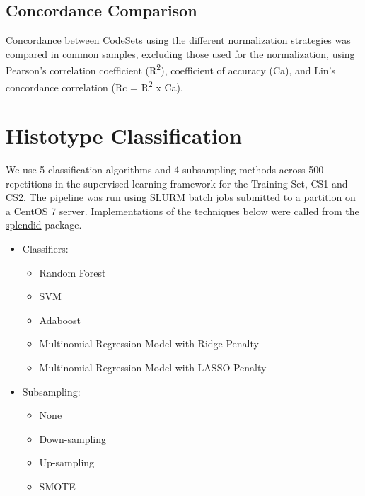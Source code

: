 \documentclass[
]{report}
\providecommand{\tightlist}{%
  \setlength{\itemsep}{0pt}\setlength{\parskip}{0pt}}
\begin{document}
\hypertarget{concordance-comparison}{%
\subsection{Concordance Comparison}\label{concordance-comparison}}

Concordance between CodeSets using the different normalization strategies was compared in common samples, excluding those used for the normalization, using Pearson's correlation coefficient (R\textsuperscript{2}), coefficient of accuracy (Ca), and Lin's concordance correlation (Rc = R\textsuperscript{2} x Ca).

\hypertarget{histotype-classification}{%
\section{Histotype Classification}\label{histotype-classification}}

We use 5 classification algorithms and 4 subsampling methods across 500 repetitions in the supervised learning framework for the Training Set, CS1 and CS2. The pipeline was run using SLURM batch jobs submitted to a partition on a CentOS 7 server. Implementations of the techniques below were called from the \href{https://alinetalhouk.github.io/splendid/}{splendid} package.

\begin{itemize}
\item
  Classifiers:

  \begin{itemize}
  \tightlist
  \item
    Random Forest
  \item
    SVM
  \item
    Adaboost
  \item
    Multinomial Regression Model with Ridge Penalty
  \item
    Multinomial Regression Model with LASSO Penalty
  \end{itemize}
\item
  Subsampling:

  \begin{itemize}
  \tightlist
  \item
    None
  \item
    Down-sampling
  \item
    Up-sampling
  \item
    SMOTE
  \end{itemize}
\end{itemize}
\end{document}
